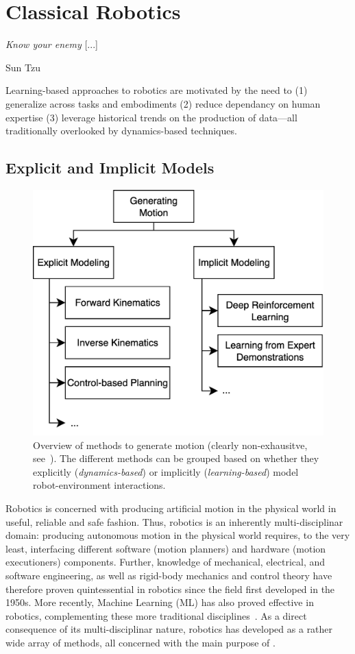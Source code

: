 \section{Classical Robotics}

\epigraph{\textit{Know your enemy} [...]}{Sun Tzu}

\begin{tldr}
Learning-based approaches to robotics are motivated by the need to (1) generalize across tasks and embodiments (2) reduce dependancy on human expertise (3) leverage historical trends on the production of data---all traditionally overlooked by dynamics-based techniques.
\end{tldr}

\subsection{Explicit and Implicit Models}
\label{sec:classical}

\begin{figure}
    \centering
    \includegraphics[width=0.5\linewidth]{figures/ch2/ch2-approaches.png}
    \caption{Overview of methods to generate motion (clearly non-exhausitve, see~\citet{bekrisStateRobotMotion2024}). The different methods can be grouped based on whether they explicitly (\emph{dynamics-based}) or implicitly (\emph{learning-based}) model robot-environment interactions.}
    \label{fig:generating-motion-atlas}
\end{figure}

Robotics is concerned with producing artificial motion in the physical world in useful, reliable and safe fashion.
Thus, robotics is an inherently multi-disciplinar domain: producing autonomous motion in the physical world requires, to the very least, interfacing different software (motion planners) and hardware (motion executioners) components.
Further, knowledge of mechanical, electrical, and software engineering, as well as rigid-body mechanics and control theory have therefore proven quintessential in robotics since the field first developed in the 1950s.
More recently, Machine Learning (ML) has also proved effective in robotics, complementing these more traditional disciplines~\citep{connellRobotLearning1993}.
As a direct consequence of its multi-disciplinar nature, robotics has developed as a rather wide array of methods, all concerned with the main purpose of .

